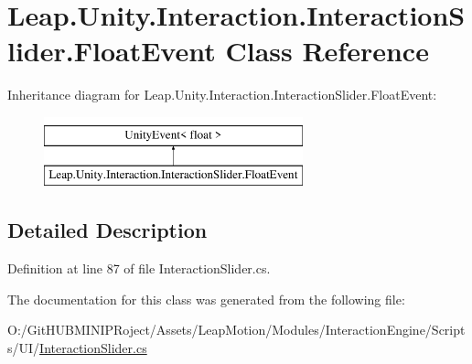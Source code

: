 \hypertarget{class_leap_1_1_unity_1_1_interaction_1_1_interaction_slider_1_1_float_event}{}\section{Leap.\+Unity.\+Interaction.\+Interaction\+Slider.\+Float\+Event Class Reference}
\label{class_leap_1_1_unity_1_1_interaction_1_1_interaction_slider_1_1_float_event}
Inheritance diagram for Leap.\+Unity.\+Interaction.\+Interaction\+Slider.\+Float\+Event\+:\begin{figure}[H]
\begin{center}
\leavevmode
\includegraphics[height=2.000000cm]{class_leap_1_1_unity_1_1_interaction_1_1_interaction_slider_1_1_float_event}
\end{center}
\end{figure}


\subsection{Detailed Description}


Definition at line 87 of file Interaction\+Slider.\+cs.



The documentation for this class was generated from the following file\+:\begin{DoxyCompactItemize}
\item 
O\+:/\+Git\+H\+U\+B\+M\+I\+N\+I\+P\+Roject/\+Assets/\+Leap\+Motion/\+Modules/\+Interaction\+Engine/\+Scripts/\+U\+I/\mbox{\hyperlink{_interaction_slider_8cs}{Interaction\+Slider.\+cs}}\end{DoxyCompactItemize}
